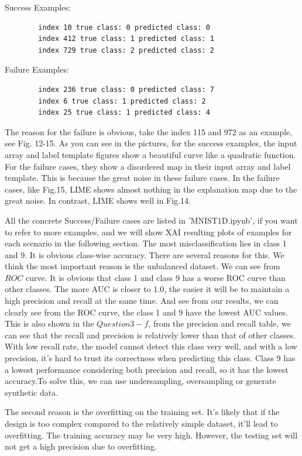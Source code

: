 \documentclass[conference]{IEEEtran}
\begin{document}
	Success Examples:
	\begin{lstlisting}
		index 10 true class: 0 predicted class: 0
		index 412 true class: 1 predicted class: 1
		index 729 true class: 2 predicted class: 2
	\end{lstlisting}
	Failure Examples:
	\begin{lstlisting}
		index 236 true class: 0 predicted class: 7
		index 6 true class: 1 predicted class: 2
		index 25 true class: 1 predicted class: 4
	\end{lstlisting}
	The reason for the failure is obvious, take the index 115 and 972 as an example, see Fig. 12-15. As you can see in the pictures, for the success examples, the input array and label template figures show a beautiful curve like a quadratic function. For the failure cases, they show a disordered map in their input array and label template. This is because the great noise in these failure cases. In the failure cases, like Fig.15, LIME shows almost nothing in the explanation map due to the great noise. In contrast, LIME shows well in Fig.14.\par
	All the concrete Success/Failure cases are listed in 'MNIST1D.ipynb', if you want to refer to more examples, and we will show XAI resulting plots of examples for each scenario in the following section.
	The most misclassification lies in class 1 and 9. It is obvious class-wise accuracy.
    There are several reasons for this. We think the most important reason is the unbalanced dataset. 
    We can see from $ROC$ curve. It is obvious that class 1 and class 9 has a worse ROC curve than other classes.
    The more AUC is closer to 1.0, the easier it will be to maintain a high precision and recall at the same time.
    And see from our results, we can clearly see from the ROC curve, the class 1 and 9 have the lowest AUC values.
    This is also shown in the $Question 3-f$, from the precision and recall table, we can see that the recall and precision is relatively lower than that of other classes.
    With low recall rate, the model cannot detect this class very well, and with a low precision, it's hard to trust its correctness when predicting this class.
    Class 9 has a lowest performance considering both precision and recall, so it has the lowest accuracy.To solve this, we can use undersampling, oversampling or generate synthetic data.\par
    The second reason is the overfitting on the training set. It's likely that if the design is too complex compared to the relatively simple dataset, it'll lead to overfitting. The training accuracy may be very high. However, the testing set will not get a high precision due to overfitting.
\end{document}
